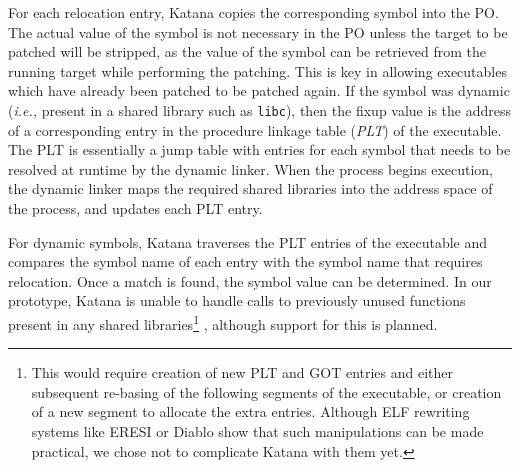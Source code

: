 For each relocation entry, Katana copies the corresponding symbol into
the PO. The actual value of the symbol is not necessary in the PO
unless the target to be patched will be stripped, as the value of the
symbol can be retrieved from the running target while performing the
patching. This is key in allowing executables which have already been
patched to be patched again.
If the symbol was
dynamic ({\it i.e.,} present in a shared library such as {\tt libc}),
then the fixup value is the address of a corresponding entry in the
procedure linkage table ({\it PLT}) of the executable.  The PLT is
essentially a jump table with entries for each symbol that needs to be
resolved at runtime by the dynamic linker.  When the process begins
execution, the dynamic linker maps the required shared libraries into
the address space of the process, and updates each PLT entry.

For dynamic symbols, Katana traverses the PLT entries of the
executable and compares the symbol name of each entry with
the symbol name that requires relocation. Once a match is found, the
symbol value can be determined. In our prototype,
Katana is unable to handle calls to previously
unused functions present in any shared libraries\footnote{This would
  require creation of new PLT and GOT entries and either subsequent
  re-basing of the following segments of the executable, or creation
  of a new segment to allocate the extra entries. Although ELF
  rewriting systems like ERESI or Diablo show that such manipulations
  can be made practical, we chose not to complicate Katana with
  them yet.}
, although support for this is planned.

